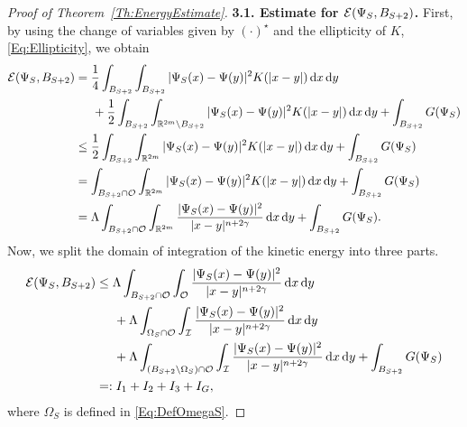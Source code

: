 \begin{proof}[Proof of Theorem~\ref{Th:EnergyEstimate}]
\textbf{3.1. Estimate for $\mathcal{E}(\Psi_S,B_{S+2})$.}
First, by using the change of variables given by $(\cdot)^\star$ and the ellipticity of $K$, \eqref{Eq:Ellipticity}, we obtain
\begin{align*}
\mathcal{E}(\Psi_S,B_{S+2}) &= \frac{1}{4} \int_{B_{S+2}} \int_{B_{S+2}} |\Psi_S(x)-\Psi(y)|^2K(|x-y|) \,\mathrm{d} x\,\mathrm{d} y \\
&\hspace{5mm} +\frac{1}{2} \int_{B_{S+2}} \int_{\mathbb{R}^{2m} \setminus B_{S+2}} |\Psi_S(x)-\Psi(y)|^2K(|x-y|) \,\mathrm{d} x\,\mathrm{d} y + \int_{B_{S+2}} G(\Psi_S) \\
&\leq \frac{1}{2} \int_{B_{S+2}} \int_{\mathbb{R}^{2m}} |\Psi_S(x)-\Psi(y)|^2K(|x-y|) \,\mathrm{d} x\,\mathrm{d} y + \int_{B_{S+2}} G(\Psi_S) \\
&= \int_{B_{S+2} \cap \mathcal{O}} \int_{\mathbb{R}^{2m}} |\Psi_S(x)-\Psi(y)|^2K(|x-y|) \,\mathrm{d} x\,\mathrm{d} y + \int_{B_{S+2}} G(\Psi_S) \\
&= \Lambda \int_{B_{S+2} \cap \mathcal{O}} \int_{\mathbb{R}^{2m}} \frac{|\Psi_S(x)-\Psi(y)|^2}{|x-y|^{n+2\gamma}} \,\mathrm{d} x\,\mathrm{d} y + \int_{B_{S+2}} G(\Psi_S).
\end{align*}
Now, we split the domain of integration of the kinetic energy into three parts.
\begin{align*}
\mathcal{E}(\Psi_S,B_{S+2}) &\leq \Lambda \int_{B_{S+2} \cap \mathcal{O}} \int_{\mathcal{O}} \frac{|\Psi_S(x)-\Psi(y)|^2}{|x-y|^{n+2\gamma}} \,\mathrm{d} x\,\mathrm{d} y \\
&\hspace{5mm} + \Lambda \int_{\Omega_S \cap \mathcal{O}} \int_{\mathcal{I}} \frac{|\Psi_S(x)-\Psi(y)|^2}{|x-y|^{n+2\gamma}} \,\mathrm{d} x\,\mathrm{d} y \\
&\hspace{5mm} + \Lambda \int_{(B_{S+2}\setminus \Omega_S) \cap \mathcal{O}} \int_{\mathcal{I}} \frac{|\Psi_S(x)-\Psi(y)|^2}{|x-y|^{n+2\gamma}} \,\mathrm{d} x\,\mathrm{d} y + \int_{B_{S+2}} G(\Psi_S) \\
&=:I_1+I_2+I_3+I_G,
\end{align*}
where $\Omega_S$ is defined in \eqref{Eq:DefOmegaS}. 


\end{proof}
